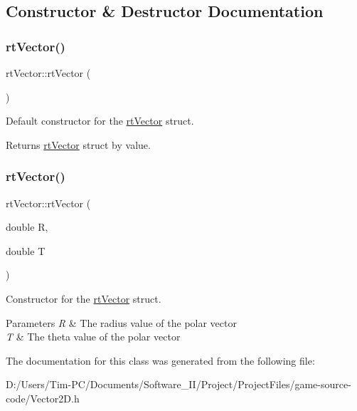 \subsection{Constructor \& Destructor Documentation}
\mbox{\label{structrt_vector_a925c0326bc5d918e8bdb36a867b66228}} 
\subsubsection{\texorpdfstring{rt\+Vector()}{rtVector()}\hspace{0.1cm}{\footnotesize\ttfamily [1/2]}}
{\footnotesize\ttfamily rt\+Vector\+::rt\+Vector (\begin{DoxyParamCaption}{ }\end{DoxyParamCaption})\hspace{0.3cm}{\ttfamily [inline]}}



Default constructor for the \hyperlink{structrt_vector}{rt\+Vector} struct. 

\begin{DoxyReturn}{Returns}
\hyperlink{structrt_vector}{rt\+Vector} struct by value. 
\end{DoxyReturn}
\mbox{\label{structrt_vector_a97268ebbcad1df534201f5225f7ccbb0}} 
\subsubsection{\texorpdfstring{rt\+Vector()}{rtVector()}\hspace{0.1cm}{\footnotesize\ttfamily [2/2]}}
{\footnotesize\ttfamily rt\+Vector\+::rt\+Vector (\begin{DoxyParamCaption}\item[{double}]{R,  }\item[{double}]{T }\end{DoxyParamCaption})\hspace{0.3cm}{\ttfamily [inline]}}



Constructor for the \hyperlink{structrt_vector}{rt\+Vector} struct. 


\begin{DoxyParams}{Parameters}
{\em R} & The radius value of the polar vector \\
\hline
{\em T} & The theta value of the polar vector \\
\hline
\end{DoxyParams}


The documentation for this class was generated from the following file\+:\begin{DoxyCompactItemize}
\item 
D\+:/\+Users/\+Tim-\/\+P\+C/\+Documents/\+Software\+\_\+\+I\+I/\+Project/\+Project\+Files/game-\/source-\/code/Vector2\+D.\+h\end{DoxyCompactItemize}

